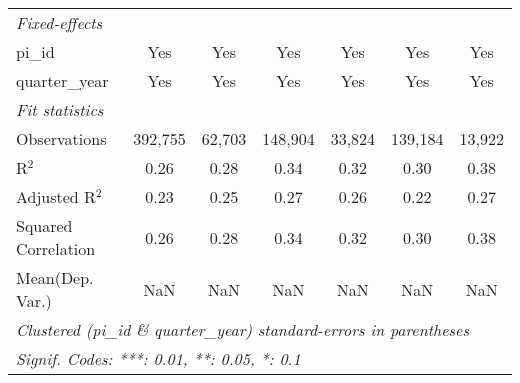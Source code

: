 \begin{tabular}{lcccccc}
   \emph{Fixed-effects}\\
   pi\_id                                                     & Yes            & Yes           & Yes            & Yes            & Yes           & Yes\\  
   quarter\_year                                              & Yes            & Yes           & Yes            & Yes            & Yes           & Yes\\  
   \midrule
   \emph{Fit statistics}\\
   Observations                                               & 392,755        & 62,703        & 148,904        & 33,824         & 139,184       & 13,922\\  
   R$^2$                                                      & 0.26           & 0.28          & 0.34           & 0.32           & 0.30          & 0.38\\  
   Adjusted R$^2$                                             & 0.23           & 0.25          & 0.27           & 0.26           & 0.22          & 0.27\\  
   Squared Correlation                                        & 0.26           & 0.28          & 0.34           & 0.32           & 0.30          & 0.38\\  
Mean(Dep. Var.) & NaN & NaN & NaN & NaN & NaN & NaN \\
   \midrule \midrule
   \multicolumn{7}{l}{\emph{Clustered (pi\_id \& quarter\_year) standard-errors in parentheses}}\\
   \multicolumn{7}{l}{\emph{Signif. Codes: ***: 0.01, **: 0.05, *: 0.1}}\\
\end{tabular}
\par\endgroup
